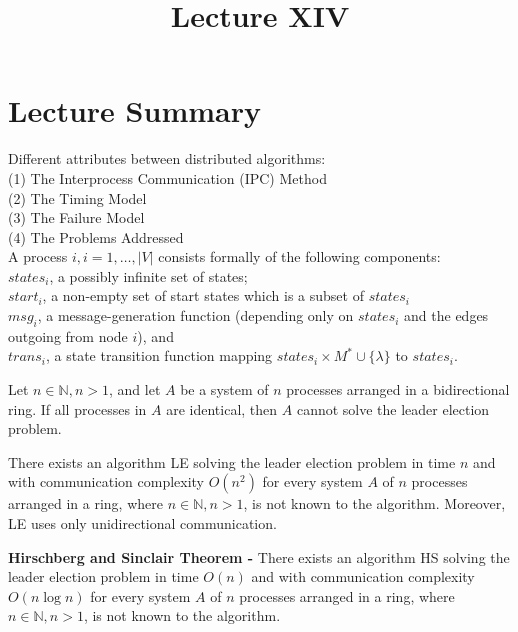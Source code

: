 \documentclass[a4paper]{article}
\title{\vspace{-2cm}Lecture XIV\vspace{-2cm}}
\date{}
\begin{document}
\maketitle
\section{Lecture Summary}
Different attributes between distributed algorithms: \\
(1) The Interprocess Communication (IPC) Method \\
(2) The Timing Model \\
(3) The Failure Model \\
(4) The Problems Addressed \\
A process $i, i= 1, \ldots, |V|$ consists formally of the following components: \\
$states_{i}$, a possibly infinite set of states; \\
$start_{i}$, a non-empty set of start states which is a subset of $states_{i}$ \\
$msg_{i}$, a message-generation function (depending only on $states_{i}$ and the edges outgoing from node $i$), and \\
$trans_{i}$, a state transition function mapping $states_{i} \times M^{*} \cup \{ \lambda \}$ to $states_{i}$.
\begin{theorem}
Let $n \in \mathbb{N}, n > 1$, and let $A$ be a system of $n$ processes arranged in a bidirectional ring. If all processes in $A$ are identical, then $A$ cannot solve the leader election problem.
\end{theorem}


\begin{theorem}
There exists an algorithm LE solving the leader election problem in time $n$ and with communication complexity $O(n^{2})$ for every system $A$ of $n$ processes arranged in a ring, where $n \in \mathbb{N}, n > 1$, is not known to the algorithm. Moreover, LE uses only unidirectional communication.
\end{theorem}


\begin{theorem}
\textbf{Hirschberg and Sinclair Theorem -} There exists an algorithm HS solving the leader election problem in time $O(n)$ and with communication complexity $O(n \log{n})$ for every system $A$ of $n$ processes arranged in a ring, where $n \in \mathbb{N}, n > 1$, is not known to the algorithm.
\end{theorem}
\end{document}
